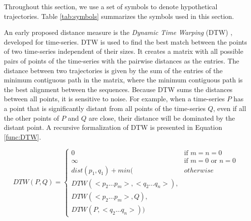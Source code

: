 Throughout this section, we use a set of symbols to denote hypothetical trajectories. Table \ref{tab:symbols} summarizes the symbols used in this section.

\begin{table}[!h]
    \centering
    \caption{Symbol meanings}
    \label{tab:symbols}
\end{table}

An early proposed distance measure is the \emph{Dynamic Time Warping} (DTW) \cite{berndt1994using}, developed for time-series. DTW is used to find the best match between the points of two time-series independent of their sizes. It creates a matrix with all possible pairs of points of the time-series with the pairwise distances as the entries.
The distance between two trajectories is given by the sum of the entries of the minimum contiguous path in the matrix, where the minimum contiguous path is the best alignment between the sequences. Because DTW sums the distances between all points, it is sensitive to noise. For example, when a time-series $P$ has a point that is significantly distant from all points of the time-series $Q$, even if all the other points of $P$ and $Q$ are close, their distance will be dominated by the distant point. A recursive formalization of DTW is presented in Equation \ref{func:DTW}.

\begin{equation}
\label{func:DTW}
  DTW(P, Q) = 
    \begin{cases} 
        0 & \text{if } m = n = 0\\ 
      \infty & \text{if } m = 0 \text{ or } n = 0\\ 
      dist(p_1, q_1) + min( & otherwise\\
      DTW(<p_2...p_m>,<q_2...q_n>),\\
      DTW(<p_2...p_m>, Q), \\
      DTW(P, <q_2...q_n>)) &
    \end{cases}
\end{equation}

